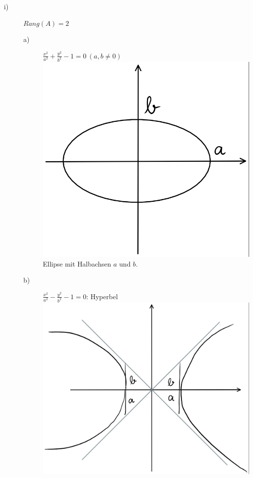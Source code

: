 \documentclass{scrbook}
\begin{document}
\begin{description}
\item[i)] $Rang(A) = 2$
\begin{description}
\item[a)] $\frac{x^2}{a^2} + \frac{y^2}{b^2} -1 = 0 \ (a,b\neq 0)$
\\
\includegraphics{Satz_15_2_1.png}
\\
Ellipse mit Halbachsen $a$ und $b$.
\item[b)] $\frac{x^2}{a^2} - \frac{y^2}{b^2} -1 = 0$: Hyperbel
\\
\includegraphics{Satz_15_2_2.png}

\end{description}
\end{description}
\end{document}
